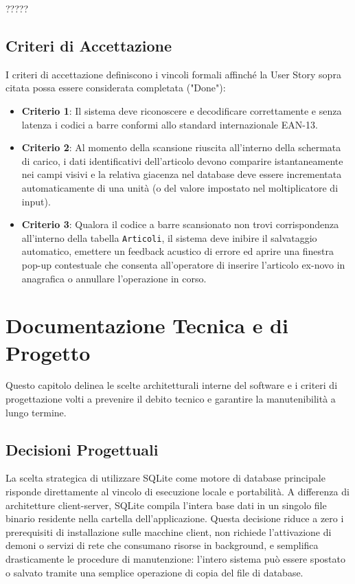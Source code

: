 \documentclass[a4paper,12pt]{article}
\begin{document}
	?????
	
	\subsection{Criteri di Accettazione}
	I criteri di accettazione definiscono i vincoli formali affinché la User Story sopra citata possa essere considerata completata ("Done"):
	\begin{itemize}
		\item \textbf{Criterio 1}: Il sistema deve riconoscere e decodificare correttamente e senza latenza i codici a barre conformi allo standard internazionale EAN-13.
		\item \textbf{Criterio 2}: Al momento della scansione riuscita all'interno della schermata di carico, i dati identificativi dell'articolo devono comparire istantaneamente nei campi visivi e la relativa giacenza nel database deve essere incrementata automaticamente di una unità (o del valore impostato nel moltiplicatore di input).
		\item \textbf{Criterio 3}: Qualora il codice a barre scansionato non trovi corrispondenza all'interno della tabella \texttt{Articoli}, il sistema deve inibire il salvataggio automatico, emettere un feedback acustico di errore ed aprire una finestra pop-up contestuale che consenta all'operatore di inserire l'articolo ex-novo in anagrafica o annullare l'operazione in corso.
	\end{itemize}
	
	\section{Documentazione Tecnica e di Progetto}
	Questo capitolo delinea le scelte architetturali interne del software e i criteri di progettazione volti a prevenire il debito tecnico e garantire la manutenibilità a lungo termine.
	
	\subsection{Decisioni Progettuali}
	La scelta strategica di utilizzare SQLite come motore di database principale risponde direttamente al vincolo di esecuzione locale e portabilità. A differenza di architetture client-server, SQLite compila l'intera base dati in un singolo file binario residente nella cartella dell'applicazione. Questa decisione riduce a zero i prerequisiti di installazione sulle macchine client, non richiede l'attivazione di demoni o servizi di rete che consumano risorse in background, e semplifica drasticamente le procedure di manutenzione: l'intero sistema può essere spostato o salvato tramite una semplice operazione di copia del file di database.
	
\end{document}
